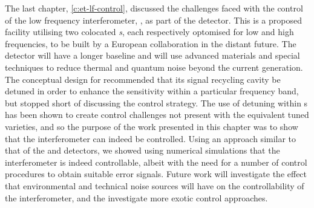 The last chapter, \ref{c:et-lf-control}, discussed the challenges faced with the control of the low frequency interferometer, \ETLF{}, as part of the \ET{} detector. This is a proposed facility utilising two colocated \emph{\DRFPMI{}s}, each respectively optomised for low and high frequencies, to be built by a European collaboration in the distant future. The detector will have a longer baseline and will use advanced materials and special techniques to reduce thermal and quantum noise beyond the current generation. The conceptual design for \ETLF{} recommended that its signal recycling cavity be detuned in order to enhance the sensitivity within a particular frequency band, but stopped short of discussing the control strategy. The use of detuning within \DRFPMI{}s has been shown to create control challenges not present with the equivalent tuned varieties, and so the purpose of the work presented in this chapter was to show that the interferometer can indeed be controlled. Using an approach similar to that of the \ALIGO{} and \AVIRGO{} detectors, we showed using numerical simulations that the interferometer is indeed controllable, albeit with the need for a number of control procedures to obtain suitable error signals. Future work will investigate the effect that environmental and technical noise sources will have on the controllability of the interferometer, and the investigate more exotic control approaches.